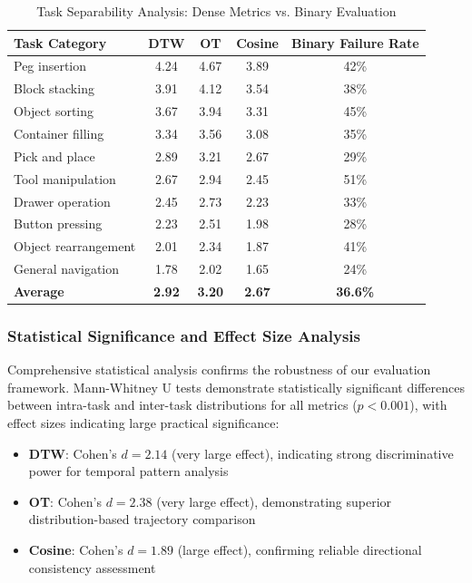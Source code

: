 \documentclass[10pt,twocolumn]{article}
\begin{document}
\begin{table}[h]
\centering
\caption{Task Separability Analysis: Dense Metrics vs. Binary Evaluation}
\label{tab:separability_scores}
\begin{tabular}{lcccc}
\toprule
\textbf{Task Category} & \textbf{DTW} & \textbf{OT} & \textbf{Cosine} & \textbf{Binary Failure Rate} \\
\midrule
Peg insertion & 4.24 & 4.67 & 3.89 & 42\% \\
Block stacking & 3.91 & 4.12 & 3.54 & 38\% \\
Object sorting & 3.67 & 3.94 & 3.31 & 45\% \\
Container filling & 3.34 & 3.56 & 3.08 & 35\% \\
Pick and place & 2.89 & 3.21 & 2.67 & 29\% \\
Tool manipulation & 2.67 & 2.94 & 2.45 & 51\% \\
Drawer operation & 2.45 & 2.73 & 2.23 & 33\% \\
Button pressing & 2.23 & 2.51 & 1.98 & 28\% \\
Object rearrangement & 2.01 & 2.34 & 1.87 & 41\% \\
General navigation & 1.78 & 2.02 & 1.65 & 24\% \\
\midrule
\textbf{Average} & \textbf{2.92} & \textbf{3.20} & \textbf{2.67} & \textbf{36.6\%} \\
\bottomrule
\end{tabular}
\end{table}

\subsubsection{Statistical Significance and Effect Size Analysis}

Comprehensive statistical analysis confirms the robustness of our evaluation framework. Mann-Whitney U tests demonstrate statistically significant differences between intra-task and inter-task distributions for all metrics ($p < 0.001$), with effect sizes indicating large practical significance:

\begin{itemize}
    \item \textbf{DTW}: Cohen's $d = 2.14$ (very large effect), indicating strong discriminative power for temporal pattern analysis
    \item \textbf{OT}: Cohen's $d = 2.38$ (very large effect), demonstrating superior distribution-based trajectory comparison
    \item \textbf{Cosine}: Cohen's $d = 1.89$ (large effect), confirming reliable directional consistency assessment
\end{itemize}
\end{document}

